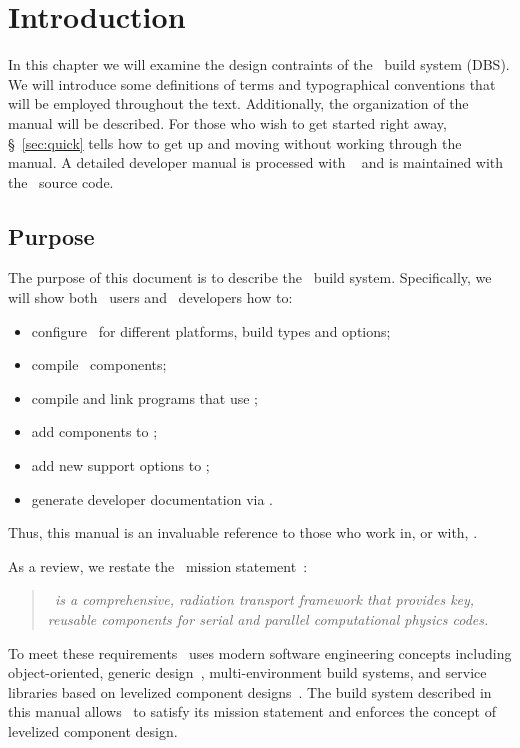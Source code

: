 
\chapter{Introduction}

In this chapter we will examine the %
design contraints of the \draco\ build system (DBS).  We will
introduce some definitions of terms and typographical conventions that
will be employed throughout the text.  Additionally, the organization
of the manual will be described.  For those who wish to get started
right away, \S~\ref{sec:quick} tells how to get up and moving without
working through the manual.  A detailed developer manual is processed
with ~\cite{doxygen} and is maintained with the
\draco\ source code.


\section{Purpose}
\label{sec:purpose}

The purpose of this document is to describe the \draco\ build system.
Specifically, we will show both \draco\ users and \draco\ developers how to: 
\begin{itemize}
\item configure \draco\ for different platforms, build types and options; 
\item compile \draco\ components; 
\item compile and link programs that use \draco;
\item add components to \draco;
\item add new support options to \draco;
\item generate developer documentation via .
\end{itemize}
Thus, this manual is an invaluable reference to those who work in, or
with, \draco.

As a review, we restate the \draco\ mission statement~\cite{rn98046}:
\begin{quote}
  \slshape \draco\ is a comprehensive, radiation transport framework
  that provides key, reusable components for serial and parallel %
  computational physics codes.
\end{quote}  
To meet these requirements \draco\ uses modern software engineering
concepts including object-oriented, generic design~\cite{ooadid}, multi-environment
build systems, and service libraries based on levelized component
designs~\cite{la96}.  The build system described in this manual allows \draco\ to
satisfy its mission statement and enforces the concept of levelized
component design.

